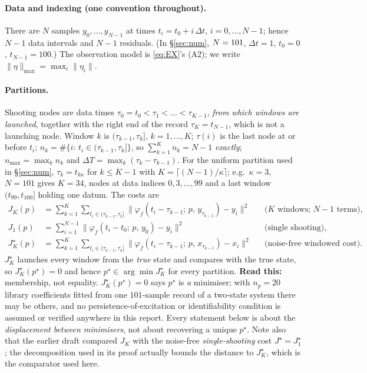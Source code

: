 \documentclass[11pt]{article}
\theoremstyle{remark}\newtheorem{remark}{Remark}
\newcommand{\pstar}{p^\star}
\newcommand{\norm}[1]{\lVert #1\rVert}
\newcommand{\flow}[3]{\varphi_f(#1;\,#2,\,#3)}
\newcommand{\readthis}[1]{\textbf{Read this:} #1}
\begin{document}
\paragraph{Data and indexing (one convention throughout).}
There are $N$ samples $y_0,\dots,y_{N-1}$ at times $t_i=t_0+i\,\Delta t$, $i=0,\dots,N-1$; hence $N-1$ data intervals and $N-1$ residuals. (In \S\ref{sec:num}, $N=101$, $\Delta t=1$, $t_0=0$, $t_{N-1}=100$.) The observation model is \eqref{eq:EX}'s (A2); we write $\norm{\eta}_{\max}=\max_i\norm{\eta_i}$.

\paragraph{Partitions.}
Shooting nodes are data times $\tau_0=t_0<\tau_1<\dots<\tau_{K-1}$, \emph{from which windows are launched}, together with the right end of the record $\tau_K=t_{N-1}$, which is not a launching node. Window $k$ is $(\tau_{k-1},\tau_k]$, $k=1,\dots,K$; $\tau(i)$ is the last node at or before $t_i$; $n_k=\#\{i:\,t_i\in(\tau_{k-1},\tau_k]\}$, so $\sum_{k=1}^{K}n_k=N-1$ \emph{exactly}; $n_{\max}=\max_k n_k$ and $\Delta T=\max_k(\tau_k-\tau_{k-1})$. For the uniform partition used in \S\ref{sec:num}, $\tau_k=t_{k\kappa}$ for $k\le K-1$ with $K=\lceil (N-1)/\kappa\rceil$; e.g.\ $\kappa=3$, $N=101$ gives $K=34$, nodes at data indices $0,3,\dots,99$ and a last window $(t_{99},t_{100}]$ holding one datum. The costs are
\begin{align}
J_K(p)&=\sum_{k=1}^{K}\sum_{t_i\in(\tau_{k-1},\tau_k]}
  \norm{\flow{t_i-\tau_{k-1}}{p}{y_{\tau_{k-1}}}-y_i}^2
  &&\text{($K$ windows; $N-1$ terms),}\label{eq:JK}\\
J_1(p)&=\sum_{i=1}^{N-1}\norm{\flow{t_i-t_0}{p}{y_0}-y_i}^2 &&\text{(single shooting),}\label{eq:J1}\\
J_K^\star(p)&=\sum_{k=1}^{K}\sum_{t_i\in(\tau_{k-1},\tau_k]}
  \norm{\flow{t_i-\tau_{k-1}}{p}{x_{\tau_{k-1}}}-x_i}^2 &&\text{(noise-free windowed cost).}
\label{eq:JKstar}
\end{align}
$J_K^\star$ launches every window from the \emph{true} state and compares with the true state, so $J_K^\star(\pstar)=0$ and hence $\pstar\in\arg\min J_K^\star$ for every partition. \readthis{membership, not equality. $J_K^\star(\pstar)=0$ says $\pstar$ is \emph{a} minimiser; with $n_p=20$ library coefficients fitted from one $101$-sample record of a two-state system there may be others, and no persistence-of-excitation or identifiability condition is assumed or verified anywhere in this report. Every statement below is about the \emph{displacement between minimisers}, not about recovering a unique $\pstar$. Note also that the earlier draft compared $J_K$ with the noise-free \emph{single-shooting} cost $J^\star=J_1^\star$; the decomposition used in its proof actually bounds the distance to $J_K^\star$, which is the comparator used here.}
\end{document}
